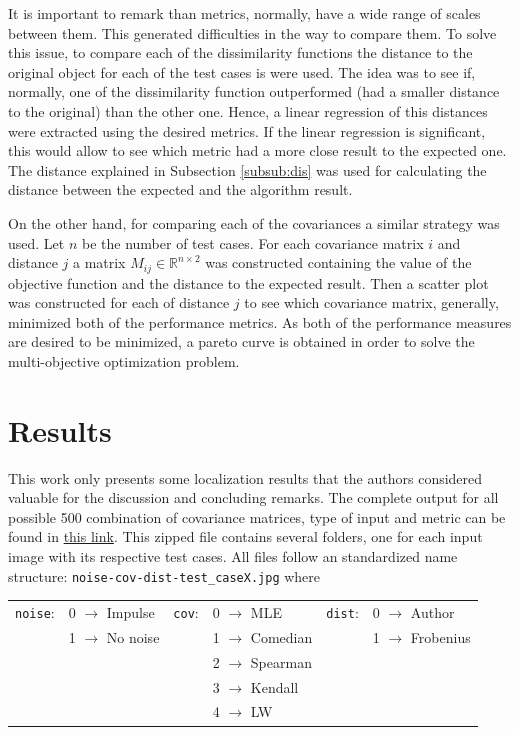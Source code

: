 \documentclass[11pt]{article}
\theoremstyle{definition}
\theoremstyle{remark}
\theoremstyle{remark}
\theoremstyle{remark}
\newcommand{\R}{{\mathbb{R}}}
\begin{document}
It is important to remark than metrics, normally, have a wide range of scales
between them. This generated difficulties in the way to compare them. To solve
this issue, to compare each of the dissimilarity functions the distance to the
original object for each of the test cases is were used. The idea was to see if,
normally, one of the dissimilarity function outperformed (had a smaller distance
to the original) than the other one. Hence, a linear regression of this
distances were extracted using the desired metrics. If the linear regression is
significant, this would allow to see which metric had a more close result to the
expected one. The distance explained in Subsection \ref{subsub:dis} was used for
calculating the distance between the expected and the algorithm result.

On the other hand, for comparing each of the covariances a similar strategy was
used. Let $n$ be the number of test cases. For each covariance matrix $i$ and
distance $j$ a matrix $M_{ij} \in \R^{n\times2}$ was constructed containing the
value of the objective function and the distance to the expected result. Then a
scatter plot was constructed for each of distance $j$ to see which covariance
matrix, generally, minimized both of the performance metrics. As both of the
performance measures are desired to be minimized, a pareto curve is obtained in
order to solve the multi-objective optimization problem.

\section{Results}\label{sec:res}
This work only presents some localization results that the authors considered
valuable for the discussion and concluding remarks. The complete output for all
possible 500 combination of covariance matrices, type of input and metric can be
found in \href{https://bit.ly/2VMkvne}{this link}. This zipped file contains
several folders, one for each input image with its respective test cases. All
files follow an standardized name structure:
\texttt{noise-cov-dist-test\_caseX.jpg} where

\begin{table}[H]
  \centering
  \begin{tabular}{llllll}
    \texttt{noise}: & 0 $\rightarrow$ Impulse  & \texttt{cov}: & 0 $\rightarrow$ MLE      & \texttt{dist}: & 0 $\rightarrow$ Author    \\
                    & 1 $\rightarrow$ No noise &               & 1 $\rightarrow$ Comedian &                & 1 $\rightarrow$ Frobenius \\
                    &                          &               & 2 $\rightarrow$ Spearman &                &                           \\
                    &                          &               & 3 $\rightarrow$ Kendall  &                &                           \\
                    &                          &               & 4 $\rightarrow$ LW       &                &
  \end{tabular}
\end{table}
\end{document}
